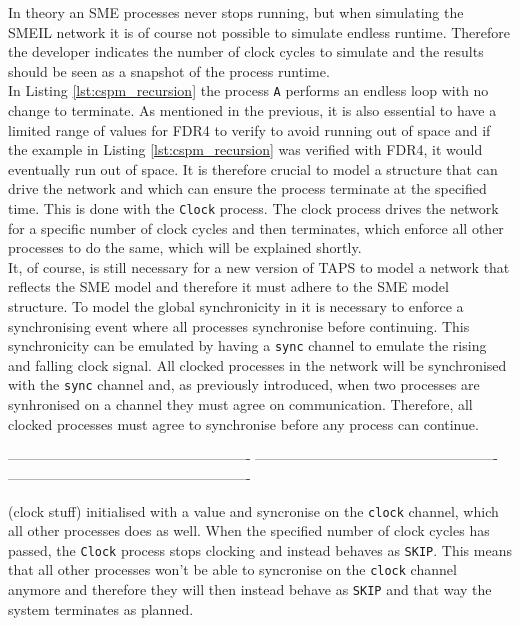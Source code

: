 In theory an SME processes never stops running, but when simulating the SMEIL network it is of course not possible to simulate endless runtime. Therefore the developer indicates the number of clock cycles to simulate and the results should be seen as a snapshot of the process runtime. \\

In Listing \ref{lst:cspm_recursion} the process \texttt{A} performs an endless loop with no change to terminate. As mentioned in the previous, it is also essential to have a limited range of values for FDR4 to verify to avoid running out of space and if the example in Listing \ref{lst:cspm_recursion} was verified with FDR4, it would eventually run out of space. It is therefore crucial to model a structure that can drive the network and which can ensure the process terminate at the specified time. This is done with the \texttt{Clock} process. The clock process drives the network for a specific number of clock cycles and then terminates, which enforce all other processes to do the same, which will be explained shortly. \\


It, of course, is still necessary for a new version of TAPS to model a \cspm{} network that reflects the SME model and therefore it must adhere to the SME model structure. To model the global synchronicity in \cspm{} it is necessary to enforce a synchronising event where all processes synchronise before continuing. This synchronicity can be emulated by having a \texttt{sync} channel to emulate the rising and falling clock signal. All clocked processes in the network will be synchronised with the \texttt{sync} channel and, as previously introduced, when two processes are synhronised on a channel they must agree on communication. Therefore, all clocked processes must agree to synchronise before any process can continue.


----------------------------------------------------
----------------------------------------------------
----------------------------------------------------


(clock stuff)
initialised with a value and syncronise on the \texttt{clock} channel, which all other processes does as well. When the specified number of clock cycles has passed, the \texttt{Clock} process stops clocking and instead behaves as \texttt{SKIP}. This means that all other processes won't be able to syncronise on the \texttt{clock} channel anymore and therefore they will then instead behave as \texttt{SKIP} and that way the system terminates as planned.\\




